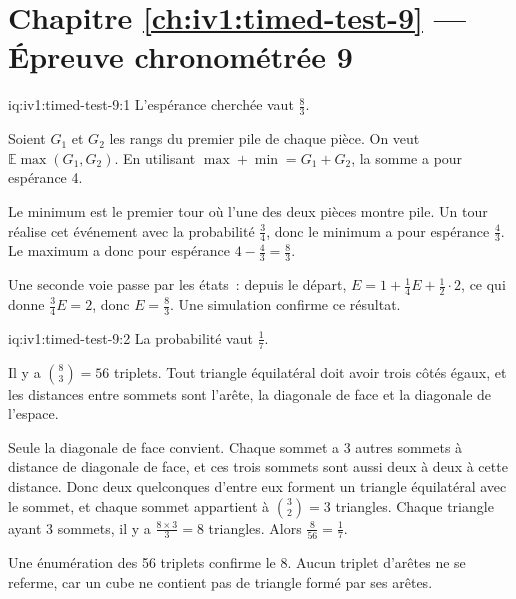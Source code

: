 \section*{Chapitre \ref{ch:iv1:timed-test-9} --- Épreuve chronométrée 9}

\begin{solution}{iq:iv1:timed-test-9:1}
L'espérance cherchée vaut $\frac83$.

Soient $G_1$ et $G_2$ les rangs du premier pile de chaque pièce. On veut $\mathbb{E}\max(G_1, G_2)$. En utilisant $\max + \min = G_1 + G_2$, la somme a pour espérance 4.

Le minimum est le premier tour où l'une des deux pièces montre pile. Un tour réalise cet événement avec la probabilité $\frac34$, donc le minimum a pour espérance $\frac43$. Le maximum a donc pour espérance $4 - \frac43 = \frac83$.

Une seconde voie passe par les états~: depuis le départ, $E = 1 + \frac14E + \frac12 \cdot 2$, ce qui donne $\frac34E = 2$, donc $E = \frac83$. Une simulation confirme ce résultat.

\end{solution}

\begin{solution}{iq:iv1:timed-test-9:2}
La probabilité vaut $\frac17$.

Il y a $\binom83 = 56$ triplets. Tout triangle équilatéral doit avoir trois côtés égaux, et les distances entre sommets sont l'arête, la diagonale de face et la diagonale de l'espace.

Seule la diagonale de face convient. Chaque sommet a 3 autres sommets à distance de diagonale de face, et ces trois sommets sont aussi deux à deux à cette distance. Donc deux quelconques d'entre eux forment un triangle équilatéral avec le sommet, et chaque sommet appartient à $\binom32 = 3$ triangles. Chaque triangle ayant 3 sommets, il y a $\frac{8 \times 3}{3} = 8$ triangles. Alors $\frac{8}{56} = \frac17$.

Une énumération des 56 triplets confirme le 8. Aucun triplet d'arêtes ne se referme, car un cube ne contient pas de triangle formé par ses arêtes.

\end{solution}

